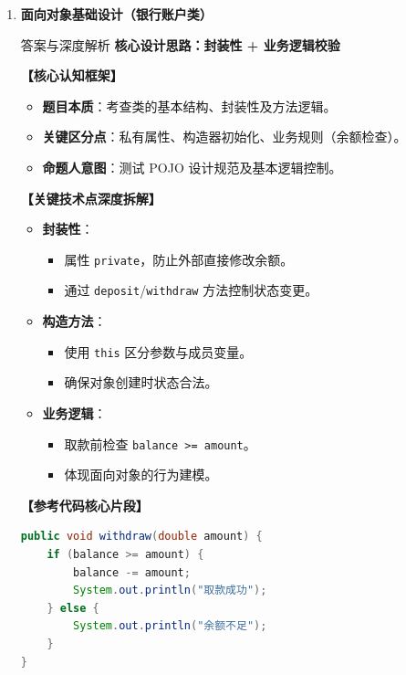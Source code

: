 ﻿\documentclass[12pt, a4paper]{ctexart}
\newcommand{\code}[1]{\texttt{#1}}
\begin{document}
\begin{enumerate}[label=\textbf{\arabic*.}, leftmargin=*, itemsep=1.5em]
	\item \textbf{面向对象基础设计（银行账户类）}
	      \begin{bluebox}{答案与深度解析}
		      \textbf{核心设计思路：封装性 + 业务逻辑校验}

		      \textbf{【核心认知框架】}
		      \begin{itemize}[leftmargin=*, nosep]
			      \item \textbf{题目本质}：考查类的基本结构、封装性及方法逻辑。
			      \item \textbf{关键区分点}：私有属性、构造器初始化、业务规则（余额检查）。
			      \item \textbf{命题人意图}：测试 POJO 设计规范及基本逻辑控制。
		      \end{itemize}

		      \textbf{【关键技术点深度拆解】}
		      \begin{itemize}[leftmargin=*, nosep]
			      \item \textbf{封装性}：
			            \begin{itemize}
				            \item 属性 \code{private}，防止外部直接修改余额。
				            \item 通过 \code{deposit}/\code{withdraw} 方法控制状态变更。
			            \end{itemize}
			      \item \textbf{构造方法}：
			            \begin{itemize}
				            \item 使用 \code{this} 区分参数与成员变量。
				            \item 确保对象创建时状态合法。
			            \end{itemize}
			      \item \textbf{业务逻辑}：
			            \begin{itemize}
				            \item 取款前检查 \code{balance >= amount}。
				            \item 体现面向对象的行为建模。
			            \end{itemize}
		      \end{itemize}

		      \textbf{【参考代码核心片段】}
		      \begin{lstlisting}[language=Java]
public void withdraw(double amount) {
    if (balance >= amount) {
        balance -= amount;
        System.out.println("取款成功");
    } else {
        System.out.println("余额不足");
    }
}
\end{lstlisting}
	      \end{bluebox}


\end{enumerate}
\end{document}
